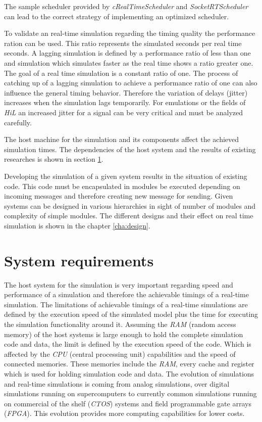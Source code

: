The sample scheduler provided by \emph{cRealTimeScheduler} and \emph{SocketRTScheduler} can lead to the correct strategy of implementing an optimized scheduler.

To validate an real-time simulation regarding the timing quality the performance ration can be used.
This ratio represents the simulated seconds per real time seconds.
A lagging simulation is defined by a performance ratio of less than one and simulation which simulates faster as the real time shows a ratio greater one.
The goal of a real time simulation is a constant ratio of one.
The process of catching up of a lagging simulation to achieve a performance ratio of one can also influence the general timing behavior.
Therefore the variation of delays (jitter) increases when the simulation lags temporarily.
For emulations or the fields of \emph{HiL} an increased jitter for a signal can be very critical and must be analyzed carefully.

The host machine for the simulation and its components affect the achieved simulation times.
The dependencies of the host system and the results of existing researches is shown in section \ref{sec:simulation_requirements}.

Developing the simulation of a given system results in the situation of existing code.
This code must be encapsulated in modules be executed depending on incoming messages and therefore creating new message for sending.
Given systems can be designed in various hierarchies in sight of number of modules and complexity of simple modules.
The different designs and their effect on real time simulation is shown in the chapter \ref{cha:design}.

\section{System requirements}
\label{sec:simulation_requirements}
The host system for the simulation is very important regarding speed and performance of a simulation and therefore the achievable timings of a real-time simulation.
The limitations of achievable timings of a real-time simulations are defined by the execution speed of the simulated model plus the time for executing the simulation functionality around it.
Assuming the \emph{RAM} (random access memory) of the host systems is large enough to hold the complete simulation code and data, the limit is defined by the execution speed of the code.
Which is affected by the \emph{CPU} (central processing unit) capabilities and the speed of connected memories.
These memories include the \emph{RAM}, every cache and register which is used for holding simulation code and data.
The evolution of simulations and real-time simulations is coming from analog simulations, over digital simulations running on supercomputers to currently common simulations running on commercial of the shelf (\emph{CTOS}) systems and field programmable gate arrays (\emph{FPGA}).
This evolution provides more computing capabilities for lower costs. \cite[section IV]{belanger_what_2010}